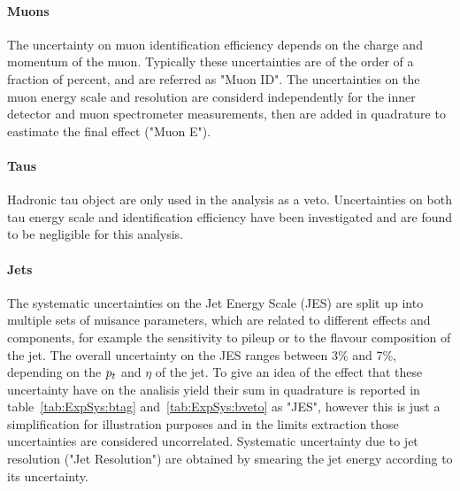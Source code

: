 \paragraph{Muons}
The uncertainty on muon identification efficiency depends on the charge and momentum of the muon.
Typically these uncertainties are of the order of a fraction of percent, and are referred as "Muon ID". 
The uncertainties on the muon energy scale and resolution are considerd independently for the inner detector 
and muon spectrometer measurements, then are added in quadrature to eastimate the final effect ("Muon E").

\paragraph{Taus}
Hadronic tau object are only used in the analysis as a veto. Uncertainties on both tau energy scale 
and identification efficiency have been investigated and are found to be negligible for this analysis.

\paragraph{Jets}
The systematic uncertainties on the Jet Energy Scale (JES) are split up into multiple sets of nuisance parameters, which
are related to different effects and components, for example the sensitivity to pileup or
to the flavour composition of the jet. The overall uncertainty on the JES ranges 
between 3\% and 7\%, depending on the $p_{t}$ and $\eta$ of the jet. To give an idea of the effect that these
uncertainty have on the analisis yield their sum in quadrature is reported in table~\ref{tab:ExpSys:btag} and~\ref{tab:ExpSys:bveto} as "JES", however
this is just a simplification for illustration purposes and in the limits extraction those uncertainties are considered uncorrelated.
Systematic uncertainty due to jet resolution ("Jet Resolution") are obtained by smearing the jet energy 
according to its uncertainty.

